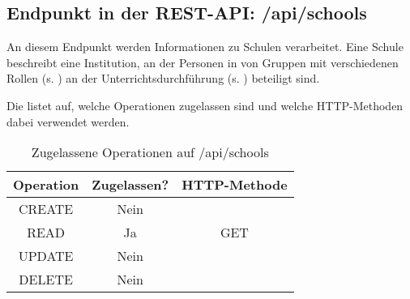\subsection{Endpunkt in der REST-API: /api/schools}
\label{sec:end:rest:api:schools}
An diesem Endpunkt werden Informationen zu Schulen verarbeitet. Eine Schule beschreibt eine Institution, an der Personen in von Gruppen mit verschiedenen Rollen (s. ) an der Unterrichtsdurchführung (s. ) beteiligt sind.

Die  listet auf, welche Operationen zugelassen sind und welche HTTP-Methoden dabei verwendet werden. 


\begin{table}[!htbp]
	\begin{tabular}{|c|c|c|}
		\hline
			\textbf{Operation} & \textbf{Zugelassen?} & \textbf{HTTP-Methode} \\ \hline
			CREATE & Nein & \\ \hline 
			READ & Ja & GET \\ \hline
			UPDATE & Nein & \\ \hline 
			DELETE & Nein & \\ \hline
	\end{tabular}

		\caption{Zugelassene Operationen auf /api/schools}
		\label{tab:end:rest:api:schools:meth}
\end{table}